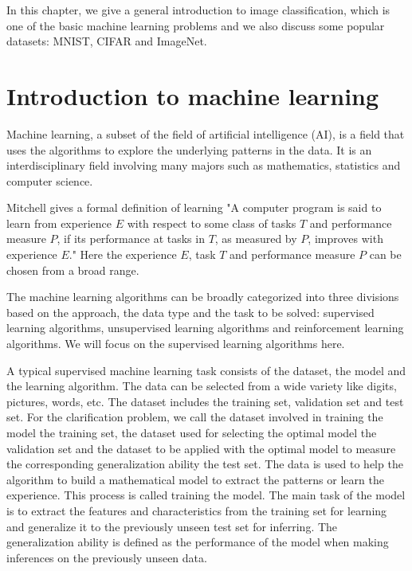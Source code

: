 In this chapter, we give a general introduction to image classification, which is one of the basic machine learning problems and we also discuss some popular datasets: MNIST, CIFAR and ImageNet.

\section{Introduction to machine learning}
Machine learning, a subset of the field of artificial intelligence (AI), is a field that uses the algorithms to explore the underlying patterns in the data. It is an interdisciplinary field involving many majors such as mathematics, statistics and computer science.

Mitchell \cite{mitchell1997machine} gives a formal definition of learning "A computer program is said to learn from experience $E$ with respect to some class of tasks $T$ and performance measure $P$, if its performance at tasks in $T$, as measured by $P$, improves with experience $E$." Here the experience $E$, task $T$ and performance measure $P$ can be chosen from a broad range.

The machine learning algorithms can be broadly categorized into three divisions based on the approach, the data type and the task to be solved: supervised learning algorithms, unsupervised learning algorithms and reinforcement learning algorithms. We will focus on the supervised learning algorithms here. 

A typical supervised machine learning task consists of the dataset, the model and the learning algorithm.
The data can be selected from a wide variety like digits, pictures, words, etc. The dataset includes the training set, validation set and test set.
For the clarification problem, we call the dataset involved in training the model the training set, the dataset used for selecting the optimal model the validation set and the dataset to be applied with the optimal model to measure the corresponding generalization ability the test set.
The data is used to help the algorithm to build a mathematical model to extract the patterns or learn the experience. This process is called training the model.
The main task of the model is to extract the features and characteristics from the training set for learning and generalize it to the previously unseen test set for inferring.
The generalization ability is defined as the performance of the model when making inferences on the previously unseen data.


